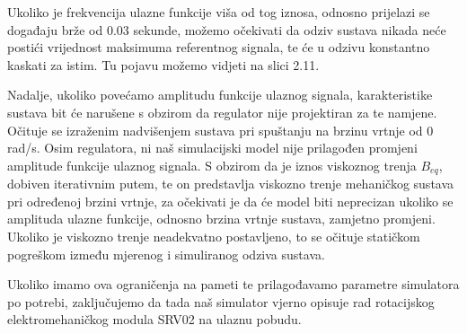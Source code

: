 \documentclass[12pt,a4paper]{article}
\begin{document}
\newpage 

Ukoliko je frekvencija ulazne funkcije viša od tog iznosa, odnosno prijelazi se događaju brže od 0.03 sekunde, možemo očekivati da odziv sustava nikada neće postići vrijednost maksimuma referentnog signala, te će u odzivu konstantno kaskati za istim.
\newline
Tu pojavu možemo vidjeti na slici 2.11.

Nadalje, ukoliko povećamo amplitudu funkcije ulaznog signala, karakteristike sustava bit će narušene s obzirom da regulator nije projektiran za te namjene. Očituje se izraženim nadvišenjem sustava pri spuštanju na brzinu vrtnje od 0 rad/s.
Osim  regulatora, ni naš simulacijski model nije prilagođen promjeni amplitude funkcije ulaznog signala. S obzirom da je iznos viskoznog trenja $B_{eq}$, dobiven iterativnim putem, te on predstavlja viskozno trenje mehaničkog sustava pri određenoj brzini vrtnje, za očekivati je da će model biti neprecizan ukoliko se amplituda ulazne funkcije, odnosno brzina vrtnje sustava, zamjetno promjeni. Ukoliko je viskozno trenje neadekvatno postavljeno, to se očituje statičkom pogreškom između mjerenog i simuliranog odziva sustava.

Ukoliko imamo ova ograničenja na pameti te prilagođavamo parametre simulatora po potrebi, zaključujemo da tada naš simulator vjerno opisuje rad rotacijskog elektromehaničkog modula SRV02 na ulaznu pobudu.
\end{document}
